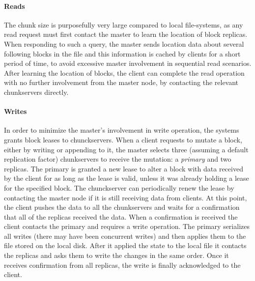 \paragraph{Reads} The chunk size is purposefully very large compared to local file-systems, as any read request must first contact the master to learn the location of block replicas.
When responding to such a query, the master sends location data about several following blocks in the file and this information is cached by clients for a short period of time, to avoid excessive master involvement in sequential read scenarios.
After learning the location of blocks, the client can complete the read operation with no further involvement from the master node, by contacting the relevant chunkservers directly.
\paragraph{Writes} In order to minimize the master's involvement in write operation, the systems grants block leases to chunckservers.
When a client requests to mutate a block, either by writing or appending to it, the master selects three (assuming a default replication factor) chunkservers to receive the mutation: a \emph{primary} and two replicas.
The primary is granted a new lease to alter a block with data received by the client for as long as the lease is valid, unless it was already holding a lease for the specified block.
The chunckserver can periodically renew the lease by contacting the master node if it is still receiving data from clients.
At this point, the client pushes the data to all the chunkservers and waits for a confirmation that all of the replicas received the data.
When a confirmation is received the client contacts the primary and requires a write operation.
The primary serializes all writes (there may have been concurrent writes) and then applies them to the file stored on the local disk.
After it applied the state to the local file it contacts the replicas and asks them to write the changes in the same order.
Once it receives confirmation from all replicas, the write is finally acknowledged to the client.
